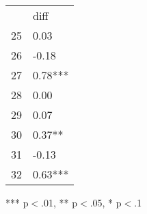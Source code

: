 \documentclass{article}
\begin{document}
\begin{table}[!h]
\centering
\begin{tabular}{ll}
\cline{1-2}
\multicolumn{1}{|l}{} &
  \multicolumn{1}{|l|}{diff} \\
\cline{1-2}
\multicolumn{1}{|l}{25} &
  \multicolumn{1}{|l|}{0.03} \\
\cline{1-2}
\multicolumn{1}{|l}{26} &
  \multicolumn{1}{|l|}{-0.18} \\
\cline{1-2}
\multicolumn{1}{|l}{27} &
  \multicolumn{1}{|l|}{0.78***} \\
\cline{1-2}
\multicolumn{1}{|l}{28} &
  \multicolumn{1}{|l|}{0.00} \\
\cline{1-2}
\multicolumn{1}{|l}{29} &
  \multicolumn{1}{|l|}{0.07} \\
\cline{1-2}
\multicolumn{1}{|l}{30} &
  \multicolumn{1}{|l|}{0.37**} \\
\cline{1-2}
\multicolumn{1}{|l}{31} &
  \multicolumn{1}{|l|}{-0.13} \\
\cline{1-2}
\multicolumn{1}{|l}{32} &
  \multicolumn{1}{|l|}{0.63***} \\
\cline{1-2}
\end{tabular}

\footnotesize{
*** p$<$.01, ** p$<$.05, * p$<$.1
}
\end{table}
\end{document}
